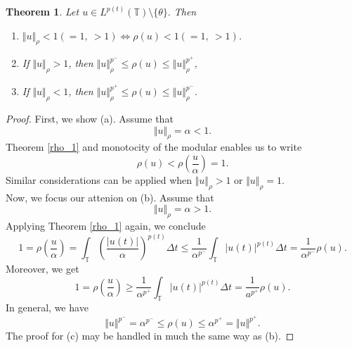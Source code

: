 \documentclass[12pt,a4paper,oneside,titlepage]{article}
\newtheorem{Twierdzenie}{Theorem}
\begin{document}
\begin{Twierdzenie}
\label{szacowania_u}
Let $u \in L^{p(t)}(\mathbb{T}) \setminus \lbrace \theta \rbrace.   $ Then 
\begin{enumerate}
\item[(a)] $\Vert u \Vert_{\rho} < 1 (=1,~ >1) \Leftrightarrow \rho(u) <1 (=1,~ >1)$.
\item[(b)] If $\Vert u \Vert_{\rho} > 1 $, then $\Vert u \Vert_{\rho}^{p^{-}} \leq \rho(u) \leq \Vert u \Vert_{\rho}^{p^{+}}$,
\item[(c)] If $\Vert u \Vert_{\rho} < 1 $, then $\Vert u \Vert_{\rho}^{p^{+}} \leq \rho(u) \leq \Vert u \Vert_{\rho}^{p^{-}}$.
\end{enumerate}

\end{Twierdzenie}

\begin{proof}
First, we show (a). Assume that
\begin{equation}
\nonumber
\Vert u \Vert_{\rho} = \alpha <1 .
\end{equation} 
Theorem \ref{rho_1} and monotocity of the modular enables us to write
\begin{equation}
\nonumber
\rho(u) < \rho\left(\frac{u}{\alpha}\right)=1.
\end{equation}
Similar considerations can be applied when $\Vert u \Vert_{\rho}>1$ or $\Vert u \Vert_{\rho}=1$. \\
\indent
Now, we focus our attenion on (b). Assume that
\begin{equation}
\nonumber
\Vert u \Vert_{\rho}= \alpha >1.
\end{equation}
Applying Theorem \ref{rho_1} again, we conclude
\begin{equation}
\nonumber
1 = \rho \left( \frac{u}{\alpha } \right)  = \int_{\mathbb{T}} \left(  \frac{\vert u(t) \vert}{\alpha } \right)^{p(t)} \Delta t \leq \frac{1}{\alpha^{p^-}} \int_{\mathbb{T}} \vert u(t) \vert^{p(t)} \Delta t = \frac{1}{\alpha^{p^-}}  \rho(u).
\end{equation}
Moreover, we get
\begin{equation}
\nonumber
1 = \rho \left( \frac{u}{\alpha } \right) \geq \frac{1}{\alpha^{p^+}}  \int_{\mathbb{T}} \vert u(t) \vert^{p(t)} \Delta t = \frac{1}{a^{p^+}}  \rho(u).
\end{equation}
In general, we have
\begin{equation}
\nonumber
\Vert u \Vert^{p^-} = \alpha^{p^-} \leq \rho(u) \leq \alpha^{p^+} = \Vert u \Vert^{p^+}.
\end{equation}
The proof for (c) may be handled in much the same way as (b).
\end{proof}
\end{document}
